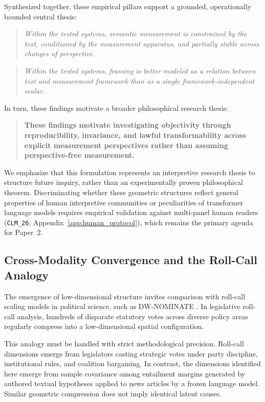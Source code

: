 \begin{enumerate}
\end{enumerate}

Synthesized together, these empirical pillars support a grounded, operationally bounded central thesis:
\begin{quote}
\emph{Within the tested systems, semantic measurement is constrained by the text, conditioned by the measurement apparatus, and partially stable across changes of perspective.}
\end{quote}
\begin{quote}
\emph{Within the tested systems, framing is better modeled as a relation between text and measurement framework than as a single framework-independent scalar.}
\end{quote}
In turn, these findings motivate a broader philosophical research thesis:
\begin{quote}
\textbf{These findings motivate investigating objectivity through reproducibility, invariance, and lawful transformability across explicit measurement perspectives rather than assuming perspective-free measurement.}
\end{quote}
We emphasize that this formulation represents an interpretive research thesis to structure future inquiry, rather than an experimentally proven philosophical theorem. Discriminating whether these geometric structures reflect general properties of human interpretive communities or peculiarities of transformer language models requires empirical validation against multi-panel human readers (\texttt{CLM\_26}; Appendix~\ref{app:human_protocol}), which remains the primary agenda for Paper~2.

\subsection{Cross-Modality Convergence and the Roll-Call Analogy}

The emergence of low-dimensional structure invites comparison with roll-call scaling models in political science, such as DW-NOMINATE \citep{poole2000}. In legislative roll-call analysis, hundreds of disparate statutory votes across diverse policy areas regularly compress into a low-dimensional spatial configuration.

This analogy must be handled with strict methodological precision. Roll-call dimensions emerge from legislators casting strategic votes under party discipline, institutional rules, and coalition bargaining. In contrast, the dimensions identified here emerge from sample covariance among entailment margins generated by authored textual hypotheses applied to news articles by a frozen language model. Similar geometric compression does not imply identical latent causes.

